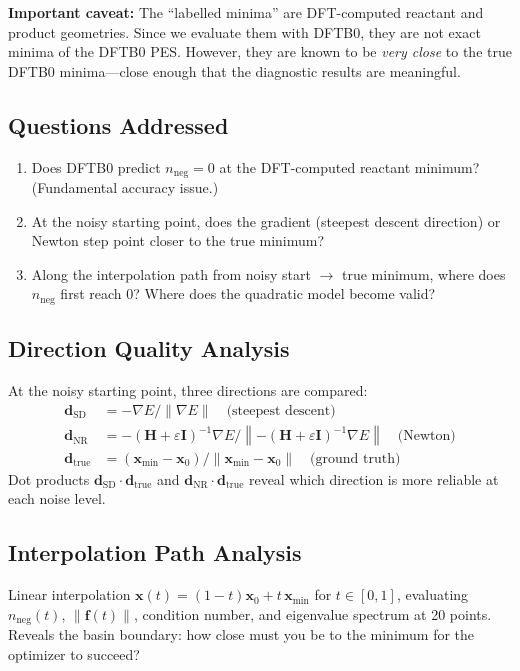 \documentclass[11pt,a4paper]{article}
\newcommand{\vect}[1]{\mathbf{#1}}
\newcommand{\mat}[1]{\mathbf{#1}}
\newcommand{\grad}{\nabla}
\newcommand{\hess}{\mat{H}}
\begin{document}
\textbf{Important caveat:} The ``labelled minima'' are DFT-computed reactant and product geometries. Since we evaluate them with DFTB0, they are not exact minima of the DFTB0 PES. However, they are known to be \emph{very close} to the true DFTB0 minima---close enough that the diagnostic results are meaningful.

\subsection{Questions Addressed}

\begin{enumerate}
  \item Does DFTB0 predict $n_\text{neg} = 0$ at the DFT-computed reactant minimum? (Fundamental accuracy issue.)
  \item At the noisy starting point, does the gradient (steepest descent direction) or Newton step point closer to the true minimum?
  \item Along the interpolation path from noisy start $\to$ true minimum, where does $n_\text{neg}$ first reach 0? Where does the quadratic model become valid?
\end{enumerate}

\subsection{Direction Quality Analysis}

At the noisy starting point, three directions are compared:
\begin{align}
  \vect{d}_\text{SD} &= -\grad E / \|\grad E\| \quad \text{(steepest descent)} \\
  \vect{d}_\text{NR} &= -(\hess + \varepsilon\mat{I})^{-1}\grad E \Big/ \left\|-(\hess + \varepsilon\mat{I})^{-1}\grad E\right\| \quad \text{(Newton)} \\
  \vect{d}_\text{true} &= (\vect{x}_\text{min} - \vect{x}_0) / \|\vect{x}_\text{min} - \vect{x}_0\| \quad \text{(ground truth)}
\end{align}
Dot products $\vect{d}_\text{SD} \cdot \vect{d}_\text{true}$ and $\vect{d}_\text{NR} \cdot \vect{d}_\text{true}$ reveal which direction is more reliable at each noise level.

\subsection{Interpolation Path Analysis}

Linear interpolation $\vect{x}(t) = (1-t)\vect{x}_0 + t\,\vect{x}_\text{min}$ for $t \in [0,1]$, evaluating $n_\text{neg}(t)$, $\|\vect{f}(t)\|$, condition number, and eigenvalue spectrum at 20 points. Reveals the basin boundary: how close must you be to the minimum for the optimizer to succeed?
\end{document}
